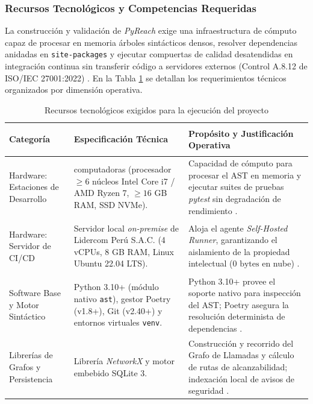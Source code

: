 \subsubsection{Recursos Tecnológicos y Competencias Requeridas}
La construcción y validación de \textit{PyReach} exige una infraestructura de cómputo capaz de procesar en memoria árboles sintácticos densos, resolver dependencias anidadas en \texttt{site-packages} y ejecutar compuertas de calidad desatendidas en integración continua sin transferir código a servidores externos (Control A.8.12 de ISO/IEC 27001:2022) \parencite{ladisa2023sok, salis2021pycg}. En la Tabla \ref{tab:recursos_tecnologicos} se detallan los requerimientos técnicos organizados por dimensión operativa. %

\begin{table}[H]
\centering
\caption{Recursos tecnológicos exigidos para la ejecución del proyecto}
\label{tab:recursos_tecnologicos}
\small
{}
\begin{tabularx}{\textwidth}{>{\bfseries\raggedright\arraybackslash}p{3.0cm} >{\raggedright\arraybackslash}p{4.6cm} X}
\toprule
\textbf{Categoría} & \textbf{Especificación Técnica} & \textbf{Propósito y Justificación Operativa} \\
\midrule
Hardware: Estaciones de Desarrollo & 
2 computadoras (procesador $\ge 6$ núcleos Intel Core i7 / AMD Ryzen 7, $\ge 16$ GB RAM, SSD NVMe). & 
Capacidad de cómputo para procesar el AST en memoria y ejecutar suites de pruebas \textit{pytest} sin degradación de rendimiento \parencite{salis2021pycg}. \\ %
\addlinespace
Hardware: Servidor de CI/CD & 
Servidor local \textit{on-premise} de Lidercom Perú S.A.C. (4 vCPUs, 8 GB RAM, Linux Ubuntu 22.04 LTS). & 
Aloja el agente \textit{Self-Hosted Runner}, garantizando el aislamiento de la propiedad intelectual ($0\text{ bytes}$ en nube) \parencite{humble2010continuous}. \\ %
\addlinespace
Software Base y Motor Sintáctico & 
Python 3.10+ (módulo nativo \texttt{ast}), gestor Poetry (v1.8+), Git (v2.40+) y entornos virtuales \texttt{venv}. & 
Python 3.10+ provee el soporte nativo para inspección del AST; Poetry asegura la resolución determinista de dependencias \parencite{salis2021pycg}. \\ %
\addlinespace
Librerías de Grafos y Persistencia & 
Librería \textit{NetworkX} y motor embebido SQLite 3. & 
Construcción y recorrido del Grafo de Llamadas y cálculo de rutas de alcanzabilidad; indexación local de avisos de seguridad \parencite{hagberg2008exploring, ryder1979constructing}. \\ %

\end{tabularx}
\end{table}
